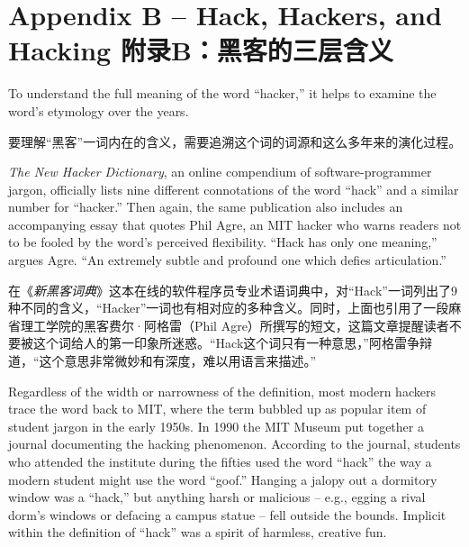 

\chapter{\ifdefined\eng
Appendix B -- Hack, Hackers, and Hacking
\fi
\ifdefined\chs
附录B：黑客的三层含义
\fi} \label{Appendix B}
\thispagestyle{empty}
\ifdefined\eng
To understand the full meaning of the word ``hacker,'' it helps to examine the word's etymology over the years.
\fi

\ifdefined\chs
要理解``黑客''一词内在的含义，需要追溯这个词的词源和这么多年来的演化过程。
\fi

\ifdefined\eng
\textit{The New Hacker Dictionary}, an online compendium of software-programmer jargon, officially lists nine different connotations of the word ``hack'' and a similar number for ``hacker.'' Then again, the same publication also includes an accompanying essay that quotes Phil Agre, an MIT hacker who warns readers not to be fooled by the word's perceived flexibility. ``Hack has only one meaning,'' argues Agre. ``An extremely subtle and profound one which defies articulation.''  %
\fi

\ifdefined\chs
在《\textit{新黑客词典}》这本在线的软件程序员专业术语词典中，对``Hack''一词列出了9种不同的含义，``Hacker''一词也有相对应的多种含义。同时，上面也引用了一段麻省理工学院的黑客费尔·阿格雷（Phil Agre）所撰写的短文，这篇文章提醒读者不要被这个词给人的第一印象所迷惑。``Hack这个词只有一种意思，''阿格雷争辩道，``这个意思非常微妙和有深度，难以用语言来描述。'' %
\fi

\ifdefined\eng
Regardless of the width or narrowness of the definition, most modern hackers trace the word back to MIT, where the term bubbled up as popular item of student jargon in the early 1950s. In 1990 the MIT Museum put together a journal documenting the hacking phenomenon. According to the journal, students who attended the institute during the fifties used the word ``hack'' the way a modern student might use the word ``goof.'' Hanging a jalopy out a dormitory window was a ``hack,'' but anything harsh or malicious -- e.g., egging a rival dorm's windows or defacing a campus statue -- fell outside the bounds. Implicit within the definition of ``hack'' was a spirit of harmless, creative fun.
\fi

